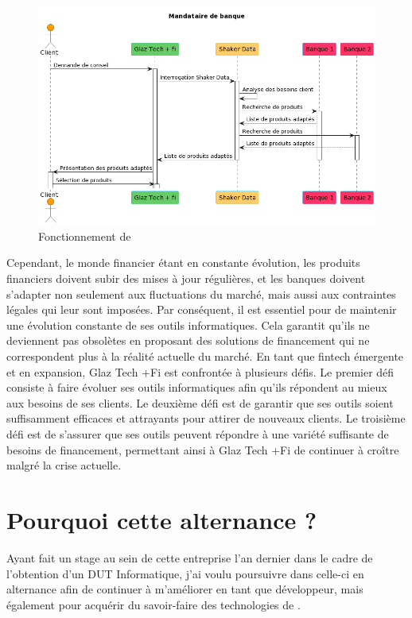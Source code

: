 \documentclass[12pt,oneside,noprintercorrection]{iut}
\begin{document}
\begin{figure}[!ht]
  \centering
  \includegraphics[width=12cm]{img/FonctionnementGlaz.png}
  \caption{Fonctionnement de \gz{}}
\end{figure}

\clearpage

Cependant, le monde financier étant en constante évolution, les produits financiers doivent subir des mises à jour régulières, et les banques doivent s'adapter non seulement aux fluctuations du marché, mais aussi aux contraintes légales qui leur sont imposées. Par conséquent, il est essentiel pour \glaz{} de maintenir une évolution constante de ses outils informatiques. Cela garantit qu'ils ne deviennent pas obsolètes en proposant des solutions de financement qui ne correspondent plus à la réalité actuelle du marché.
En tant que fintech émergente et en expansion, Glaz Tech +Fi est confrontée à plusieurs défis. Le premier défi consiste à faire évoluer ses outils informatiques afin qu'ils répondent au mieux aux besoins de ses clients. Le deuxième défi est de garantir que ses outils soient suffisamment efficaces et attrayants pour attirer de nouveaux clients. Le troisième défi est de s'assurer que ses outils peuvent répondre à une variété suffisante de besoins de financement, permettant ainsi à Glaz Tech +Fi de continuer à croître malgré la crise actuelle.

\section{Pourquoi cette alternance ?}
Ayant fait un stage au sein de cette entreprise l'an dernier dans le cadre de l'obtention d'un DUT Informatique, j'ai voulu poursuivre dans celle-ci en alternance afin de continuer à m'améliorer en tant que développeur, mais également pour acquérir du savoir-faire des technologies de \slf{}.
\end{document}
